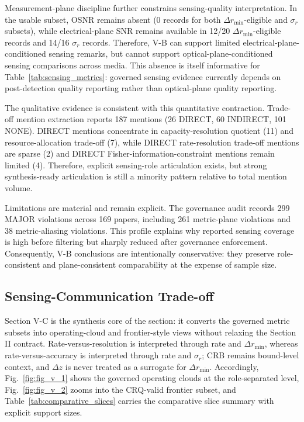 \documentclass[lettersize,journal]{IEEEtran}
\begin{document}
Measurement-plane discipline further constrains sensing-quality interpretation. In the usable subset, OSNR remains absent (0 records for both $\Delta r_{\min}$-eligible and $\sigma_r$ subsets), while electrical-plane SNR remains available in 12/20 $\Delta r_{\min}$-eligible records and 14/16 $\sigma_r$ records. Therefore, V-B can support limited electrical-plane-conditioned sensing remarks, but cannot support optical-plane-conditioned sensing comparisons across media. This absence is itself informative for Table~\ref{tab:sensing_metrics}: governed sensing evidence currently depends on post-detection quality reporting rather than optical-plane quality reporting.

The qualitative evidence is consistent with this quantitative contraction. Trade-off mention extraction reports 187 mentions (26 DIRECT, 60 INDIRECT, 101 NONE). DIRECT mentions concentrate in capacity-resolution quotient (11) and resource-allocation trade-off (7), while DIRECT rate-resolution trade-off mentions are sparse (2) and DIRECT Fisher-information-constraint mentions remain limited (4). Therefore, explicit sensing-role articulation exists, but strong synthesis-ready articulation is still a minority pattern relative to total mention volume.

Limitations are material and remain explicit. The governance audit records 299 MAJOR violations across 169 papers, including 261 metric-plane violations and 38 metric-aliasing violations. This profile explains why reported sensing coverage is high before filtering but sharply reduced after governance enforcement. Consequently, V-B conclusions are intentionally conservative: they preserve role-consistent and plane-consistent comparability at the expense of sample size.


\subsection{Sensing-Communication Trade-off}
Section V-C is the synthesis core of the section: it converts the governed metric subsets into operating-cloud and frontier-style views without relaxing the Section II contract. Rate-versus-resolution is interpreted through rate and $\Delta r_{\min}$, whereas rate-versus-accuracy is interpreted through rate and $\sigma_r$; CRB remains bound-level context, and $\Delta z$ is never treated as a surrogate for $\Delta r_{\min}$. Accordingly, Fig.~\ref{fig:fig_v_1} shows the governed operating clouds at the role-separated level, Fig.~\ref{fig:fig_v_2} zooms into the CRQ-valid frontier subset, and Table~\ref{tab:comparative_slices} carries the comparative slice summary with explicit support sizes.
\end{document}
